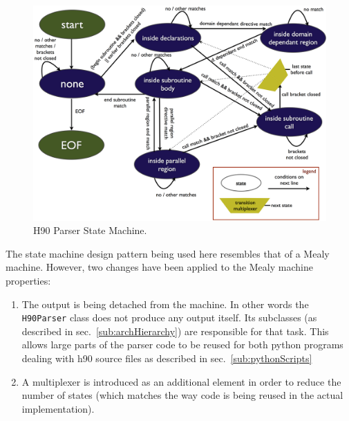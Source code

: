 \begin{figure}[htpb]
	\centering
	\includegraphics[width=14cm]{figures/parserStateMachine}
	\caption[Parser State Machine]{H90 Parser State Machine.}
	\label{figure:parserStateMachine}
\end{figure}

The state machine design pattern being used here resembles that of a Mealy machine. However, two changes have been applied to the Mealy machine properties:
\begin{enumerate}
  \item The output is being detached from the machine. In other words the \verb|H90Parser| class does not produce any output itself. Its subclasses (as described in sec.~\ref{sub:archHierarchy}) are responsible for that task. This allows large parts of the parser code to be reused for both python programs dealing with h90 source files as described in sec.~\ref{sub:pythonScripts}
  \item A multiplexer is introduced as an additional element in order to reduce the number of states (which matches the way code is being reused in the actual implementation).
\end{enumerate}

